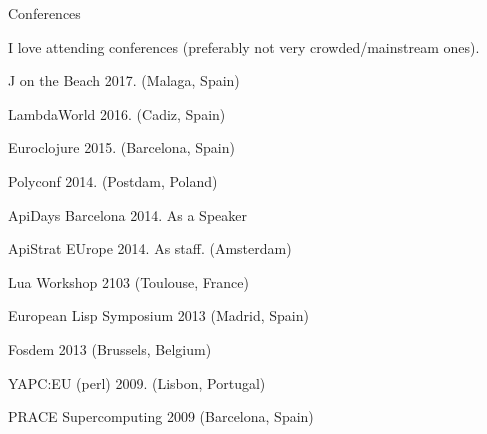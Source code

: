 \documentclass{resume} %
\begin{document}
\begin{rSection}{Conferences}

  I love attending conferences (preferably not very crowded/mainstream ones).

\item J on the Beach 2017. (Malaga, Spain)
\item LambdaWorld 2016. (Cadiz, Spain)
\item Euroclojure 2015. (Barcelona, Spain)
\item Polyconf 2014. (Postdam, Poland)
\item ApiDays Barcelona 2014. As a Speaker
\item ApiStrat EUrope 2014. As staff. (Amsterdam)
\item Lua Workshop 2103 (Toulouse, France)
\item European Lisp Symposium 2013 (Madrid, Spain)
\item Fosdem 2013 (Brussels, Belgium)
\item YAPC:EU (perl) 2009. (Lisbon, Portugal)
\item PRACE Supercomputing 2009 (Barcelona, Spain)

\end{rSection}
\end{document}
